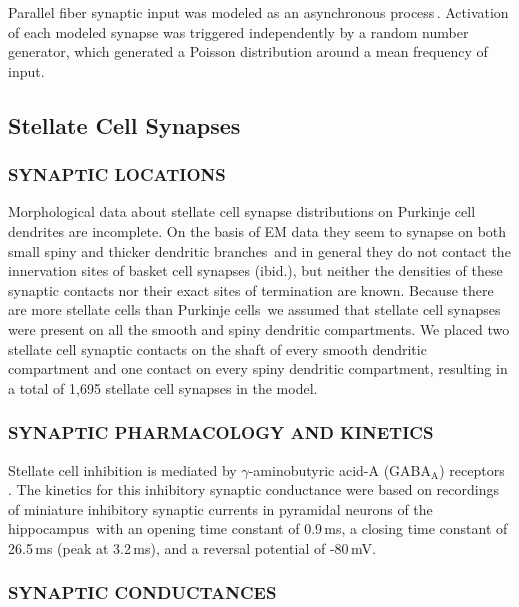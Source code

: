 \documentclass[12pt]{article}
\begin{document}
Parallel fiber synaptic input was modeled as an asynchronous process\,\cite{Bernard:1991ye}. Activation of each modeled synapse was triggered independently by a random number generator, which generated a Poisson distribution around a mean frequency of input.

\subsection*{Stellate Cell Synapses}

\subsubsection*{SYNAPTIC LOCATIONS}

Morphological data about stellate cell synapse distributions on Purkinje cell dendrites are incomplete. On the basis of EM data they seem to synapse on both small spiny and thicker dendritic branches\,\cite{Palay:1974fk} and in general they do not contact the innervation sites of basket cell synapses (ibid.), but neither the densities of these synaptic contacts nor their exact sites of termination are known. Because there are more stellate cells than Purkinje cells\,\cite{Ito:1984uq} we assumed that stellate cell synapses were present on all the smooth and spiny
dendritic compartments. We placed two stellate cell synaptic contacts on the shaft of every smooth dendritic compartment and one contact on every spiny dendritic compartment, resulting in a total of 1,695 stellate cell synapses in the model.

\subsubsection*{SYNAPTIC PHARMACOLOGY AND KINETICS}

Stellate cell inhibition is mediated by $\gamma$-aminobutyric acid-A (GABA$_{\mbox{A}}$) receptors\,
\cite{Gabbot:1986fk, Ito:1984uq, Llano:1991uq}. The kinetics for this inhibitory synaptic conductance were based on recordings of miniature inhibitory synaptic currents in pyramidal neurons of the hippocampus\,\cite{Ropert:1990kx} with an opening time constant of 0.9\,ms, a closing time constant of 26.5\,ms (peak at 3.2\,ms), and a reversal potential of -80\,mV.

\subsubsection*{SYNAPTIC CONDUCTANCES}
\end{document}
